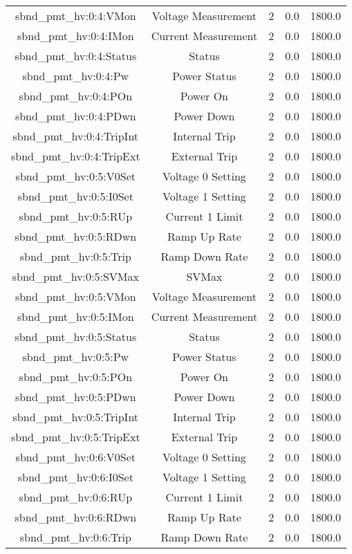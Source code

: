 \begin{table}[ptb]
\begin{tabular}{c | c c c c}
sbnd_pmt_hv:0:4:VMon & Voltage Measurement & 2 & 0.0 & 1800.0\\ 
sbnd_pmt_hv:0:4:IMon & Current Measurement & 2 & 0.0 & 1800.0\\ 
sbnd_pmt_hv:0:4:Status & Status & 2 & 0.0 & 1800.0\\ 
sbnd_pmt_hv:0:4:Pw & Power Status & 2 & 0.0 & 1800.0\\ 
sbnd_pmt_hv:0:4:POn & Power On & 2 & 0.0 & 1800.0\\ 
sbnd_pmt_hv:0:4:PDwn & Power Down & 2 & 0.0 & 1800.0\\ 
sbnd_pmt_hv:0:4:TripInt & Internal Trip & 2 & 0.0 & 1800.0\\ 
sbnd_pmt_hv:0:4:TripExt & External Trip & 2 & 0.0 & 1800.0\\ 
sbnd_pmt_hv:0:5:V0Set & Voltage 0 Setting & 2 & 0.0 & 1800.0\\ 
sbnd_pmt_hv:0:5:I0Set & Voltage 1 Setting & 2 & 0.0 & 1800.0\\ 
sbnd_pmt_hv:0:5:RUp & Current 1 Limit & 2 & 0.0 & 1800.0\\ 
sbnd_pmt_hv:0:5:RDwn & Ramp Up Rate & 2 & 0.0 & 1800.0\\ 
sbnd_pmt_hv:0:5:Trip & Ramp Down Rate & 2 & 0.0 & 1800.0\\ 
sbnd_pmt_hv:0:5:SVMax & SVMax & 2 & 0.0 & 1800.0\\ 
sbnd_pmt_hv:0:5:VMon & Voltage Measurement & 2 & 0.0 & 1800.0\\ 
sbnd_pmt_hv:0:5:IMon & Current Measurement & 2 & 0.0 & 1800.0\\ 
sbnd_pmt_hv:0:5:Status & Status & 2 & 0.0 & 1800.0\\ 
sbnd_pmt_hv:0:5:Pw & Power Status & 2 & 0.0 & 1800.0\\ 
sbnd_pmt_hv:0:5:POn & Power On & 2 & 0.0 & 1800.0\\ 
sbnd_pmt_hv:0:5:PDwn & Power Down & 2 & 0.0 & 1800.0\\ 
sbnd_pmt_hv:0:5:TripInt & Internal Trip & 2 & 0.0 & 1800.0\\ 
sbnd_pmt_hv:0:5:TripExt & External Trip & 2 & 0.0 & 1800.0\\ 
sbnd_pmt_hv:0:6:V0Set & Voltage 0 Setting & 2 & 0.0 & 1800.0\\ 
sbnd_pmt_hv:0:6:I0Set & Voltage 1 Setting & 2 & 0.0 & 1800.0\\ 
sbnd_pmt_hv:0:6:RUp & Current 1 Limit & 2 & 0.0 & 1800.0\\ 
sbnd_pmt_hv:0:6:RDwn & Ramp Up Rate & 2 & 0.0 & 1800.0\\ 
sbnd_pmt_hv:0:6:Trip & Ramp Down Rate & 2 & 0.0 & 1800.0\\ 

\end{tabular}
\end{table}
